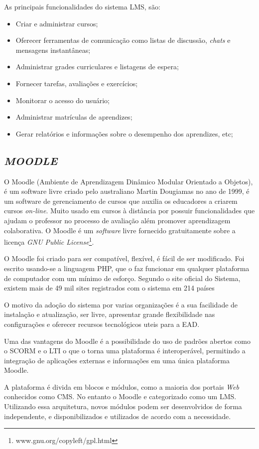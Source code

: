 As principais funcionalidades do sistema \ac{LMS}, são:
\begin{itemize}
  \item Criar e administrar cursos;
  \item Oferecer ferramentas de comunicação como listas de discussão, \textit{chats} e mensagens instantâneas;
  \item Administrar grades curriculares e listagens de espera;
  \item Fornecer tarefas, avaliações e exercícios;
  \item Monitorar o acesso do usuário;
  \item Administrar matrículas de aprendizes;
  \item Gerar relatórios e informações sobre o desempenho dos aprendizes, etc;
\end{itemize}

\subsection{\textit{MOODLE}}
O \ac{Moodle} (Ambiente de Aprendizagem Dinâmico Modular Orientado a Objetos), é um software livre criado pelo australiano Martin Dougiamas no ano de 1999, é um software de gerenciamento de cursos que auxilia os educadores a criarem cursos \textit{on-line}. Muito usado em cursos à distância por possuir funcionalidades que ajudam o professor no processo de avaliação além promover aprendizagem colaborativa. O \ac{Moodle} é um \textit{software} livre fornecido gratuitamente sobre a licença \textit{GNU Public License}\footnote{www.gnu.org/copyleft/gpl.html}. \cite{moodle}
\par
O \ac{Moodle} foi criado para ser compatível, flexível, é fácil de ser modificado. Foi escrito usando-se a linguagem \ac{PHP}, que o faz funcionar em qualquer plataforma de computador com um mínimo de esforço. Segundo o site oficial do Sistema, existem mais de 49 mil sites registrados com o sistema em 214 países \cite{moodle-stats}
\par
O motivo da adoção do sistema por varias organizações é a sua facilidade de instalação e atualização, ser livre, apresentar grande flexibilidade nas configurações e oferecer recursos tecnológicos uteis para a EAD.
\par
Uma das vantagens do \ac{Moodle} é a possibilidade do uso de padrões abertos como o \ac{SCORM} e o \ac{LTI} o que o torna uma plataforma é interoperável, permitindo a integração de aplicações externas e informações em uma única plataforma \ac{Moodle}.
\par
A plataforma é divida em blocos e módulos, como a maioria dos portais \textit{Web} conhecidos como \ac{CMS}. No entanto o \ac{Moodle} e categorizado como um \ac{LMS}. Utilizando essa arquitetura, novos módulos podem ser desenvolvidos de forma independente, e disponibilizados e utilizados de acordo com a necessidade.

